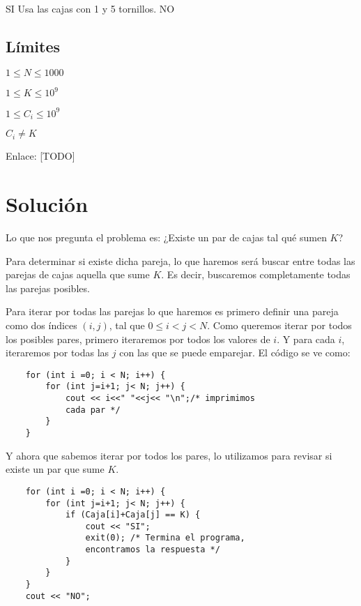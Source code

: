 \begin{casebox3}
	{SI}
	{Usa las cajas con 1 y 5 tornillos.}
	{NO}
	{}
\end{casebox3}

\subsection*{Límites}
\begin{plimits}
	\item \(1\leq N \leq 1000\)
	\item \(1\leq K \leq 10^9\)
	\item \(1\leq C_i \leq 10^9\)
	\item \(C_i \neq K\)
\end{plimits}

Enlace: [TODO]

\section * {Solución}

Lo que nos pregunta el problema es: ¿Existe un par de cajas tal qué sumen \(K\)?

Para determinar si existe dicha pareja, lo que haremos será buscar entre todas las parejas de cajas aquella que sume \(K\). Es decir, buscaremos completamente todas las parejas posibles.

Para iterar por todas las parejas lo que haremos es primero definir una pareja como dos índices \((i,j)\), tal que \(0\leq i < j <N\).  Como queremos iterar por todos los posibles pares, primero iteraremos por todos los valores de \(i\). Y para cada \(i\), iteraremos por todas las \(j\) con las que se puede emparejar. El código se ve como:

\begin{lstlisting}
	for (int i =0; i < N; i++) {
		for (int j=i+1; j< N; j++) {
			cout << i<<" "<<j<< "\n";/* imprimimos 
			cada par */ 
		}
	}
\end{lstlisting}

Y ahora que sabemos iterar por todos los pares, lo utilizamos para revisar si existe un par que sume \(K\). 

\begin{lstlisting}
	for (int i =0; i < N; i++) {
		for (int j=i+1; j< N; j++) {
			if (Caja[i]+Caja[j] == K) {
				cout << "SI";
				exit(0); /* Termina el programa, 
				encontramos la respuesta */
			}
		}
	}
	cout << "NO";
\end{lstlisting}


